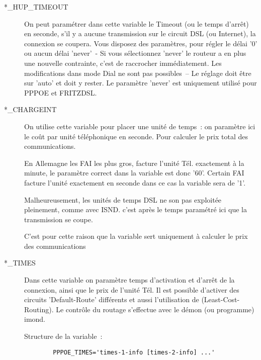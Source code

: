 \begin{description}
\item[*\_HUP\_TIMEOUT]

On peut paramétrer dans cette variable le Timeout (ou le temps d'arrêt)
en seconde, s'il y a aucune transmission sur le circuit DSL 
(ou Internet), la connexion se coupera. Vous disposez des paramètres,
pour régler le délai '0' ou aucun délai 'never'~- Si vous sélectionnez
'never' le routeur a en plus une nouvelle contrainte, c'est de raccrocher
immédiatement. Les modifications dans mode Dial ne sont pas possibles~--
Le réglage doit être sur 'auto' et doit y rester. Le paramètre 'never'
est uniquement utilisé pour PPPOE et FRITZDSL.

\item[*\_CHARGEINT]

On utilise cette variable pour placer une unité de temps~: on paramètre
ici le coût par unité téléphonique en seconde. Pour calculer le prix
total des communications.

En Allemagne les FAI les plus gros, facture l'unité Tél. exactement à la
minute, le paramètre correct dans la variable est donc '60'. Certain
FAI facture l'unité exactement en seconde dans ce cas la variable
 sera de '1'.

Malheureusement, les unités de temps DSL ne son pas exploitée pleinement,
comme avec ISND. c'est après le temps paramétré ici 
que la transmission se coupe.

C'est pour cette raison que la variable  sert
uniquement à calculer le prix des communications

\item[*\_TIMES]

Dans cette variable on paramètre temps d'activation et d'arrêt de la connexion,
ainsi que le prix de l'unité Tél. Il est possible d'activer des circuits
'Default-Route' différents et aussi l'utilisation de (Least-Cost-Routing).
Le contrôle du routage s'effectue avec le démon (ou programme) imond.

Structure de la variable~:

\begin{example}
\begin{verbatim}
        PPPOE_TIMES='times-1-info [times-2-info] ...'
\end{verbatim}
\end{example}


\end{description}
